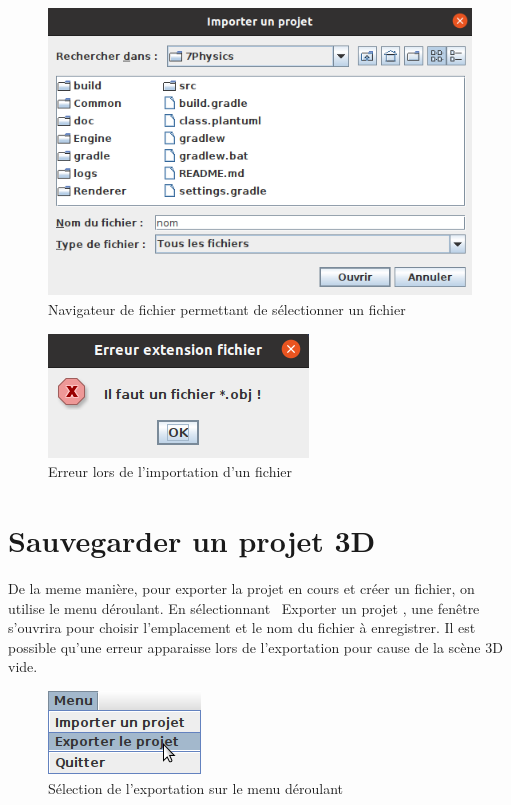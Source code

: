 \documentclass[11pt]{report}
\begin{document}
\begin{figure}[h]
  \centering
  \includegraphics[scale=0.83]{./nav_fichier_imp.png}
  \caption{Navigateur de fichier permettant de sélectionner un fichier}
\end{figure}

\begin{figure}[h]
  \centering
  \includegraphics{./error_imp.png}
  \caption{Erreur lors de l'importation d'un fichier}
\end{figure}


\section{Sauvegarder un projet 3D}

De la meme manière, pour exporter la projet en cours et créer un fichier, on utilise le menu déroulant. 
En sélectionnant \flqq\ Exporter un projet \frqq, une fenêtre s'ouvrira pour choisir l'emplacement et le nom du fichier à enregistrer.
Il est possible qu'une erreur apparaisse lors de l'exportation pour cause de la scène 3D vide.

\begin{figure}[h]
  \centering
  \includegraphics{./menu_exp.png}
  \caption{Sélection de l'exportation sur le menu déroulant}
\end{figure}
\end{document}
